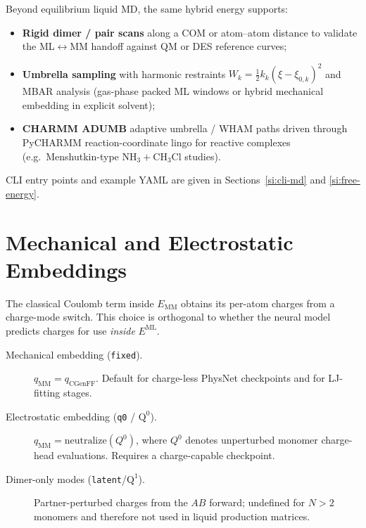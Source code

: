 \documentclass[journal=jctc,manuscript=article]{achemso}
\begin{document}
Beyond equilibrium liquid MD, the same hybrid energy supports:
\begin{itemize}
\item \textbf{Rigid dimer / pair scans} along a COM or atom--atom distance to
  validate the ML\(\leftrightarrow\)MM handoff against QM or DES reference
  curves;
\item \textbf{Umbrella sampling} with harmonic restraints
  \(W_k=\tfrac12 k_k(\xi-\xi_{0,k})^2\) and MBAR analysis\cite{Torrie1977,Shirts2008}
  (gas-phase packed ML windows or hybrid mechanical embedding in explicit
  solvent);
\item \textbf{CHARMM ADUMB} adaptive umbrella / WHAM paths\cite{Bartels1997,Kumar1992}
  driven through PyCHARMM reaction-coordinate lingo for reactive complexes
  (e.g.\ Menshutkin-type \(\mathrm{NH_3}+\mathrm{CH_3Cl}\)
  studies\cite{Gao1996Menshutkin,Truong1997Menshutkin}).
\end{itemize}
CLI entry points and example YAML are given in Sections~\ref{si:cli-md} and
\ref{si:free-energy}.

\section{Mechanical and Electrostatic Embeddings}
\label{sec:charges}

The classical Coulomb term inside \(E_{\mathrm{MM}}\) obtains its per-atom
charges from a charge-mode switch. This choice is orthogonal to whether the
neural model predicts charges for use \emph{inside} \(E^{\mathrm{ML}}\).

\begin{description}
\item[Mechanical embedding (\texttt{fixed}).]
  \(q_{\mathrm{MM}}=q_{\mathrm{CGenFF}}\). Default for charge-less PhysNet
  checkpoints and for LJ-fitting stages.
\item[Electrostatic embedding (\texttt{q0} / \(\mathrm{Q}^{0}\)).]
  \(q_{\mathrm{MM}}=\mathrm{neutralize}(Q^{0})\), where \(Q^{0}\) denotes
  unperturbed monomer charge-head evaluations. Requires a charge-capable
  checkpoint.
\item[Dimer-only modes (\texttt{latent}/\(\mathrm{Q}^{1}\)).]
  Partner-perturbed charges from the \(AB\) forward; undefined for \(N>2\)
  monomers and therefore not used in liquid production matrices.
\end{description}
\end{document}

